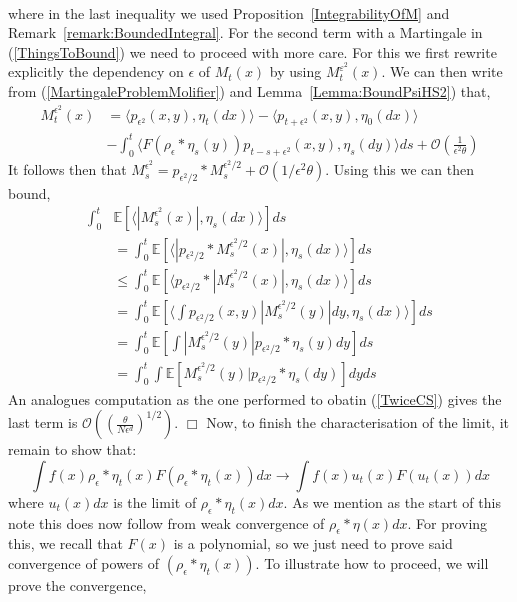 \documentclass[12pt]{article}
\newenvironment {proof}{{\noindent\bf Proof }}{\hfill $\Box$ \medskip}
\newcommand{\IE}{\mathbb E}
\begin{document}
\begin{proof}
\begin{align}
\label{TwiceCS} \end{align}
where in the last inequality we used Proposition~\ref{IntegrabilityOfM} and Remark~\ref{remark:BoundedIntegral}. For the second term with a Martingale in (\ref{ThingsToBound}) we need to proceed with more care. For this we first rewrite explicitly the dependency on $\epsilon$ of $M_t(x)$ by using $M_t^{\varepsilon^2}(x)$. We can then write from (\ref{MartingaleProblemMolifier}) and Lemma~\ref{Lemma:BoundPsiHS2}) that,
\begin{align*}
 M_t^{\epsilon^2}(x) &= \langle p_{\epsilon^2}(x,y), \eta_t(dx) \rangle - \langle p_{t + \epsilon^2}(x,y), \eta_0(dx) \rangle \\ &- \int_0^t \langle F(\rho_\epsilon*\eta_s(y)) p_{t-s+\epsilon^2}(x,y), \eta_s(dy) \rangle ds + \mathcal{O}\left(\frac{1}{\epsilon^2 \theta} \right) \end{align*}
 It follows then that $M_s^{\epsilon^2}= p_{\epsilon^2/2}*M_s^{\epsilon^2/2} + \mathcal{O}\left(1/\epsilon^2 \theta\right)$. Using this we can then bound,
 \begin{align*}
\int_0^t &\IE[ \langle |M_s^{\epsilon^2}(x)|, \eta_s(dx) \rangle ] ds \\ &= \int_0^t \IE[ \langle | p_{\epsilon^2/2}*M_s^{\epsilon^2/2}(x)|, \eta_s(dx) \rangle] ds \\ & \leq  \int_0^t \IE[ \langle p_{\epsilon^2/2}*| M_s^{\epsilon^2/2}(x)|, \eta_s(dx) \rangle] ds \\ &= \int_0^t \IE[ \langle \int p_{\epsilon^2/2}(x,y) |M_s^{\epsilon^2/2}(y)|dy, \eta_s(dx) \rangle] ds \\ &= \int_0^t \IE[ \int |M_s^{\epsilon^2/2}(y)| p_{\epsilon^2/2}*\eta_s(y) dy ] ds \\ &= \int_0^t \int \IE[ M_s^{\epsilon^2/2}(y)| p_{\epsilon^2/2} * \eta_s(dy)] dy ds 
 \end{align*}
 An analogues computation as the one performed to obatin (\ref{TwiceCS}) gives the last term is $\mathcal{O}\left( \left( \frac{\theta}{N \epsilon^d} \right)^{1/2} \right)$.
 \end{proof}
Now, to finish the characterisation of the limit, it remain to show that:
\[ \int f(x) \rho_\epsilon * \eta_t(x) F(\rho_\epsilon * \eta_t(x)) dx \rightarrow \int f(x) u_t(x) F(u_t(x)) dx \]
where $u_t(x)dx$ is the limit of $\rho_\epsilon*\eta_t(x)dx$. As we mention as the start of this note this does now follow from weak convergence of $\rho_\epsilon*\eta(x)dx$. For proving this, we recall that $F(x)$ is a polynomial, so we just need to prove said convergence of powers of $(\rho_\epsilon*\eta_t(x))$. To illustrate how to proceed, we will prove the convergence,
\end{document}
